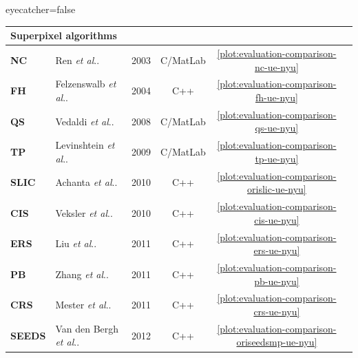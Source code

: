 \documentclass[portrait,final,a0paper,fontscale=0.28]{baposter}
\makeatletter
\DeclareRobustCommand\onedot{\futurelet\@let@token\@onedot}
\def\@onedot{\ifx\@let@token.\else.\null\fi\xspace}
\def\etal{\emph{et al}\onedot}
\makeatother
\begin{document}
\begin{poster}{eyecatcher=false}
{        \def\arraystretch{1.25}
        \begin{tabularx}{\textwidth}{l X c c c c}
            \multicolumn{5}{l}{\cellcolor{RWTHblue!50}\textbf{Superpixel algorithms}}\\\hline\hline
            \textbf{NC} & Ren \etal & 2003 & C/MatLab & \ref{plot:evaluation-comparison-nc-ue-nyu} \\ %
            \rowcolor{RWTHblue!30}\textbf{FH} & Felzenswalb \etal & 2004 & C++ & \ref{plot:evaluation-comparison-fh-ue-nyu} \\ %
            \textbf{QS} & Vedaldi \etal & 2008 & C/MatLab & \ref{plot:evaluation-comparison-qs-ue-nyu}\\ %
            \rowcolor{RWTHblue!30}\textbf{TP} & Levinshtein \etal & 2009 & C/MatLab & \ref{plot:evaluation-comparison-tp-ue-nyu} \\ %
            \textbf{SLIC} & Achanta \etal & 2010 & C++ & \ref{plot:evaluation-comparison-orislic-ue-nyu} \\ %
            \rowcolor{RWTHblue!30}\textbf{CIS} & Veksler \etal & 2010 & C++ & \ref{plot:evaluation-comparison-cis-ue-nyu} \\ %
            \textbf{ERS} & Liu \etal & 2011 & C++ & \ref{plot:evaluation-comparison-ers-ue-nyu} \\ %
            \rowcolor{RWTHblue!30}\textbf{PB} & Zhang \etal & 2011 & C++ & \ref{plot:evaluation-comparison-pb-ue-nyu} \\ %
            \textbf{CRS} & Mester \etal & 2011 & C++ & \ref{plot:evaluation-comparison-crs-ue-nyu} \\ %
            \rowcolor{RWTHblue!30}\textbf{SEEDS} & Van den Bergh \etal & 2012 & C++ & \ref{plot:evaluation-comparison-oriseedsmp-ue-nyu} \\ %

\end{tabularx}}
\end{poster}
\end{document}
